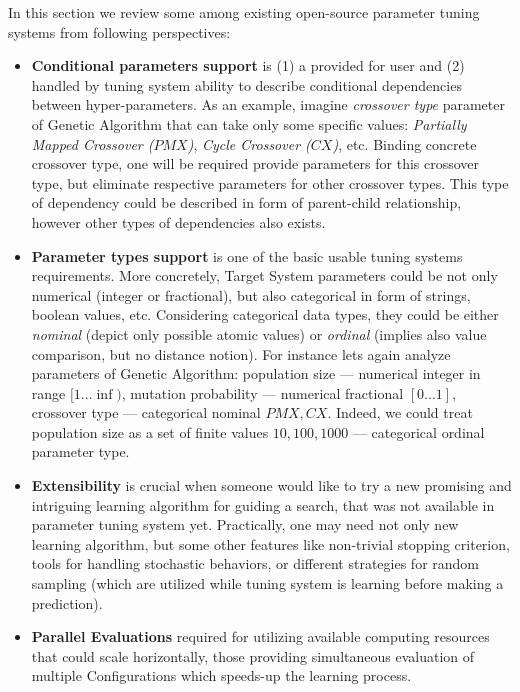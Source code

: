 In this section we review some among existing open-source parameter tuning systems from following perspectives:
\begin{itemize}[itemsep=8pt]
	\item \textbf{Conditional parameters support} is (1) a provided for user and (2) handled by tuning system ability to describe conditional dependencies between hyper-parameters. As an example, imagine \textit{crossover type} parameter of Genetic Algorithm that can take only some specific values: \textit{Partially Mapped Crossover ($PMX$)}, \textit{Cycle Crossover ($CX$)}, etc. Binding concrete crossover type, one will be required provide parameters for this crossover type, but eliminate respective parameters for other crossover types. This type of dependency could be described in form of parent-child relationship, however other types of dependencies also exists.
	
	\item \textbf{Parameter types support} is one of the basic usable tuning systems requirements. More concretely, Target System parameters could be not only numerical (integer or fractional), but also categorical in form of strings, boolean values, etc. Considering categorical data types, they could be either \textit{nominal} (depict only possible atomic values) or \textit{ordinal} (implies also value comparison, but no distance notion). For instance lets again analyze parameters of Genetic Algorithm: population size — numerical integer in range $[1...\inf)$, mutation probability — numerical fractional $[0...1]$, crossover type — categorical nominal ${PMX, CX}$. Indeed, we could treat population size as a set of finite values ${10, 100, 1000}$ — categorical ordinal parameter type.
	
	\item \textbf{Extensibility} is crucial when someone would like to try a new promising and intriguing learning algorithm for guiding a search, that was not available in parameter tuning system yet. Practically, one may need not only new learning algorithm, but some other features like non-trivial stopping criterion, tools for handling stochastic behaviors, or different strategies for random sampling (which are utilized while tuning system is learning before making a prediction).
	
	\item \textbf{Parallel Evaluations} required for utilizing available computing resources that could scale horizontally, those providing simultaneous evaluation of multiple Configurations which speeds-up the learning process.
\end{itemize}

